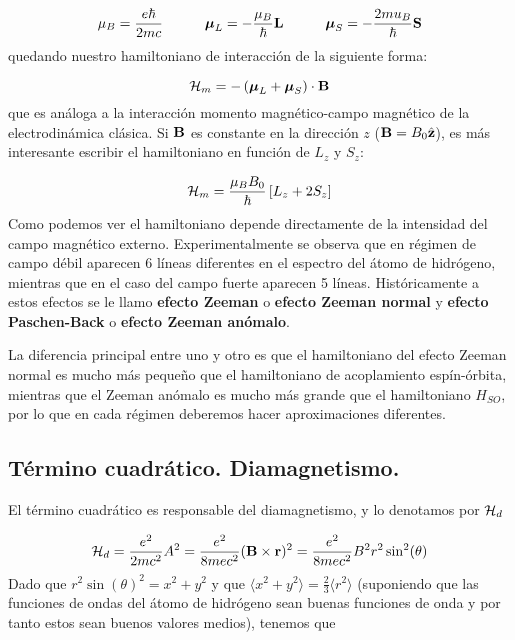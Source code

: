 \begin{equation}
	\mu_B = \frac{e\hbar}{2mc} \quad \quad \quad \boldsymbol{\mu}_L = - \frac{\mu_B}{\hbar} \mathbf{L} \quad \quad \quad \boldsymbol{\mu}_S = - \frac{2mu_B}{\hbar} \mathbf{S} 
\end{equation}
quedando nuestro hamiltoniano de interacción de la siguiente forma:

\begin{equation}
	\mathcal{H}_m = - \left( \boldsymbol{\mu}_L + \boldsymbol{\mu}_S \right) \cdot \mathbf{B}
\end{equation}
que es análoga a la interacción momento magnético-campo magnético de la electrodinámica clásica. Si $\mathbf{B}$ es constante en la dirección $z$ ($\mathbf{B} = B_0 \hat{\mathbf{z}}$), es más interesante escribir el hamiltoniano en función de $L_z$ y $S_z$:

\begin{equation}
	\mathcal{H}_m = \frac{\mu_B  B_0}{\hbar} \left[ L_z + 2 S_z \right]
\end{equation}
Como podemos ver el hamiltoniano depende directamente de la intensidad del campo magnético externo. Experimentalmente se observa que en régimen de campo débil aparecen 6 líneas diferentes en el espectro del átomo de hidrógeno, mientras que en el caso del campo fuerte aparecen 5 líneas. Históricamente a estos efectos se le llamo \textbf{efecto Zeeman} o \textbf{efecto Zeeman normal} y \textbf{efecto Paschen-Back} o \textbf{efecto Zeeman anómalo}. 

La diferencia principal entre uno y otro es que el hamiltoniano del efecto Zeeman normal es mucho más pequeño que el hamiltoniano de acoplamiento espín-órbita, mientras que el Zeeman anómalo es mucho más grande que el hamiltoniano $H_{SO}$, por lo que en cada régimen deberemos hacer aproximaciones diferentes. 



\subsection{Término cuadrático. Diamagnetismo.}

El término cuadrático es responsable del diamagnetismo, y lo denotamos por $\mathcal{H}_d$

\begin{equation}
	\mathcal{H}_d = \frac{e^2}{2mc^2} A^2 = \frac{e^2}{8 m e c^2} (\mathbf{B} \times \mathbf{r})^2 = \frac{e^2}{8 m e c^2} B^2 r^2 \sin^2 (\theta)
\end{equation}
Dado que $r^2 \sin (\theta)^2 =  x^2 + y^2$ y que $\langle x^2 + y^2 \rangle = \frac{2}{3} \langle r^2 \rangle $ (suponiendo que las funciones de ondas del átomo de hidrógeno sean buenas funciones de onda y por tanto estos sean buenos valores medios), tenemos que


